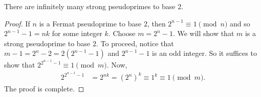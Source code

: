 \documentclass{subfile}
\begin{document}
	\begin{proposition}
		There are infinitely many strong pseudoprimes to base $2$.
	\end{proposition}
	
	\begin{proof}
		If $n$ is a Fermat pseudoprime to base $2$, then $2^{n-1} \equiv 1 \pmod n$ and so $2^{n-1}-1=nk$ for some integer $k$. Choose $m=2^{n}-1$. We will show that $m$ is a strong pseudoprime to base $2$. To proceed, notice that $m-1=2^n-2=2\left(2^{n-1}-1\right)$ and $2^{n-1}-1$ is an odd integer. So it suffices to show that $2^{2^{n-1}-1} \equiv 1 \pmod m$. Now,
			\begin{align*}
				2^{2^{n-1}-1} &= 2^{nk}= \left(2^n\right)^k \equiv 1^k \equiv 1 \pmod{m}.
			\end{align*}
		The proof is complete.
	\end{proof}
\end{document}
